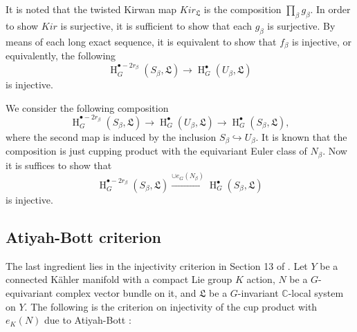 \documentclass[12pt]{amsart}
\theoremstyle{definition}
\theoremstyle{remark}
\numberwithin{equation}{section}
\newcommand{\CC}{\mathbb{C}}
\newcommand{\arw}{\longrightarrow}
\newcommand{\Hdot}{\operatorname{H}}
\begin{document}
It is noted that the twisted Kirwan map $Kir_{\mathfrak{L}}$ is the composition $\prod_{\beta} g_{\beta}$. In order to show $Kir$ is surjective, it is sufficient to show that each $g_{\beta}$ is surjective. By means of each long exact sequence, it is equivalent to show that $f_{\beta}$ is injective, or equivalently, the following
$$\Hdot^{\bullet-2r_{\beta}}_G(S_{\beta}, \mathfrak{L})\arw \Hdot^{\bullet}_G(U_{\beta},\mathfrak{L})$$is injective. 

We consider the following composition
$$ \Hdot^{\bullet-2r_{\beta}}_G(S_{\beta}, \mathfrak{L})\arw \Hdot^{\bullet}_G(U_{\beta},\mathfrak{L})\arw \Hdot^{\bullet}_G(S_{\beta}, \mathfrak{L}),$$
where the second map is induced by the inclusion $S_{\beta}\hookrightarrow U_{\beta}$. It is known that the composition is just cupping product with the equivariant Euler class of $N_{\beta}$. Now it is suffices to show that 
$$\Hdot^{\bullet-2r_{\beta}}_G(S_{\beta},\mathfrak{L})\xrightarrow{\cup e_G(N_{\beta})} \Hdot^{\bullet}_G(S_{\beta},\mathfrak{L})$$
is injective. 


\subsection{Atiyah-Bott criterion}
The last ingredient lies in the injectivity criterion in Section 13 of \cite{atiyah1983yang}. 
Let $Y$ be a  connected K\"ahler manifold with a compact Lie group $K$ action, $N$ be a $G$-equivariant complex vector bundle on it, and $\mathfrak{L}$ be a $G$-invariant $\CC$-local system on $Y$. The following is the criterion on injectivity of the cup product with $e_K(N)$ due to Atiyah-Bott \cite{atiyah1983yang}:
\end{document}
